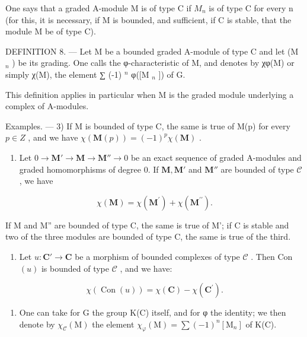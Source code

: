 One says that a graded A-module M is of type C if \(M_{n}\) is of type C for every n (for this, it is necessary, if M is bounded, and sufficient, if C is stable, that the module M be of type C).

DEFINITION 8. --- Let M be a bounded graded A-module of type C and let (M \(_{n}\) ) be its grading. One calls the φ-characteristic of M, and denotes by χφ(M) or simply χ(M), the element ∑ (-1) \(^{n}\) φ({[}M \(_{n}\) {]}) of G.

This definition applies in particular when M is the graded module underlying a complex of A-modules.

Examples. --- 3) If M is bounded of type C, the same is true of M(p) for every \(p \in Z\) , and we have \(\chi(\mathbf{M}(p)) = (-1)^{p} \chi(\mathbf{M})\) .

\begin{enumerate}
\def\labelenumi{\arabic{enumi})}
\setcounter{enumi}{3}
\tightlist
\item
  Let \(0 \to \mathbf{M}' \to \mathbf{M} \to \mathbf{M}'' \to 0\) be an exact sequence of graded A-modules and graded homomorphisms of degree 0. If \(\mathbf{M}, \mathbf{M}'\) and \(\mathbf{M}''\) are bounded of type \(\mathcal{C}\) , we have
\end{enumerate}

\[
\chi (\mathbf {M}) = \chi (\mathbf {M} ^ {\prime}) + \chi (\mathbf {M} ^ {\prime \prime}).
\]

If M and M'' are bounded of type C, the same is true of M'; if C is stable and two of the three modules are bounded of type C, the same is true of the third.

\begin{enumerate}
\def\labelenumi{\arabic{enumi})}
\setcounter{enumi}{4}
\tightlist
\item
  Let \(u: \mathbf{C}' \to \mathbf{C}\) be a morphism of bounded complexes of type \(\mathcal{C}\) . Then Con \((u)\) is bounded of type \(\mathcal{C}\) , and we have:
\end{enumerate}

\[
\chi (\operatorname{Con} (u)) = \chi (\mathbf {C}) - \chi (\mathbf {C} ^ {\prime}).
\]

\begin{enumerate}
\def\labelenumi{\arabic{enumi})}
\setcounter{enumi}{5}
\tightlist
\item
  One can take for G the group K(C) itself, and for φ the identity; we then denote by \(\chi_{\mathcal{C}}(\mathrm{M})\) the element \(\chi_{\varphi}(\mathrm{M}) = \sum (-1)^{n}[\mathrm{M}_{n}]\) of K(C).
\end{enumerate}

